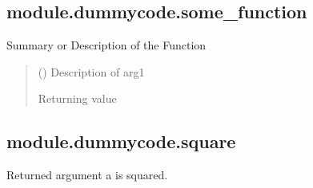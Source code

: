 \documentclass[letterpaper,10pt,english]{sphinxmanual}
\begin{document}
\sphinxstepscope


\subsection{module.dummycode.some\_function}
\label{\detokenize{_autosummary/module.dummycode.some_function:module-dummycode-some-function}}\label{\detokenize{_autosummary/module.dummycode.some_function::doc}}

\begin{fulllineitems}
\label{\detokenize{_autosummary/module.dummycode.some_function:module.dummycode.some_function}}
\pysigstartsignatures
{}
\pysigstopsignatures
\sphinxAtStartPar
Summary or Description of the Function
\begin{quote}\begin{description}
\sphinxAtStartPar
{} () \textendash{} Description of arg1

\sphinxAtStartPar
Returning value

\sphinxAtStartPar
{}

\end{description}\end{quote}

\end{fulllineitems}


\sphinxstepscope


\subsection{module.dummycode.square}
\label{\detokenize{_autosummary/module.dummycode.square:module-dummycode-square}}\label{\detokenize{_autosummary/module.dummycode.square::doc}}

\begin{fulllineitems}
\label{\detokenize{_autosummary/module.dummycode.square:module.dummycode.square}}
\pysigstartsignatures
{}
\pysigstopsignatures
\sphinxAtStartPar
Returned argument a is squared.

\end{fulllineitems}
\end{document}
